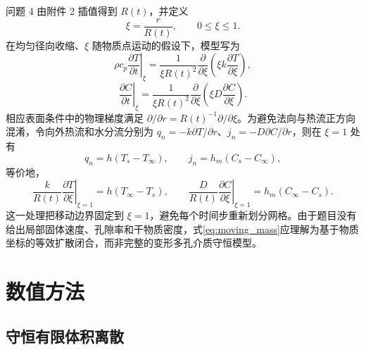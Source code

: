 \documentclass[UTF8,a4paper,zihao=-4,fontset=fandol]{ctexart}
\begin{document}
问题 4 由附件 2 插值得到 $R(t)$，并定义
\begin{equation}
\xi=\frac{r}{R(t)},\qquad 0\le\xi\le1.
\label{eq:xi}
\end{equation}
在均匀径向收缩、$\xi$ 随物质点运动的假设下，模型写为
\begin{equation}
\rho c_p\left.\frac{\partial T}{\partial t}\right|_{\xi}
=\frac{1}{\xi R(t)^2}\frac{\partial}{\partial\xi}
\left(\xi k\frac{\partial T}{\partial\xi}\right),
\label{eq:moving_heat}
\end{equation}
\begin{equation}
\left.\frac{\partial C}{\partial t}\right|_{\xi}
=\frac{1}{\xi R(t)^2}\frac{\partial}{\partial\xi}
\left(\xi D\frac{\partial C}{\partial\xi}\right).
\label{eq:moving_mass}
\end{equation}
相应表面条件中的物理梯度满足 $\partial/\partial r=R(t)^{-1}\partial/\partial\xi$。为避免法向与热流正方向混淆，令向外热流和水分流分别为 $q_n=-k\partial T/\partial r$、$j_n=-D\partial C/\partial r$，则在 $\xi=1$ 处有
\begin{equation}
q_n=h(T_s-T_\infty),\qquad j_n=h_m(C_s-C_\infty),
\label{eq:moving_flux_bc}
\end{equation}
等价地，
\begin{equation}
\frac{k}{R(t)}\left.\frac{\partial T}{\partial\xi}\right|_{\xi=1}
=h(T_\infty-T_s),\qquad
\frac{D}{R(t)}\left.\frac{\partial C}{\partial\xi}\right|_{\xi=1}
=h_m(C_\infty-C_s).
\label{eq:moving_gradient_bc}
\end{equation}
这一处理把移动边界固定到 $\xi=1$，避免每个时间步重新划分网格。由于题目没有给出局部固体速度、孔隙率和干物质密度，式\eqref{eq:moving_mass}应理解为基于物质坐标的等效扩散闭合，而非完整的变形多孔介质守恒模型。

\section{数值方法}

\subsection{守恒有限体积离散}
\end{document}
